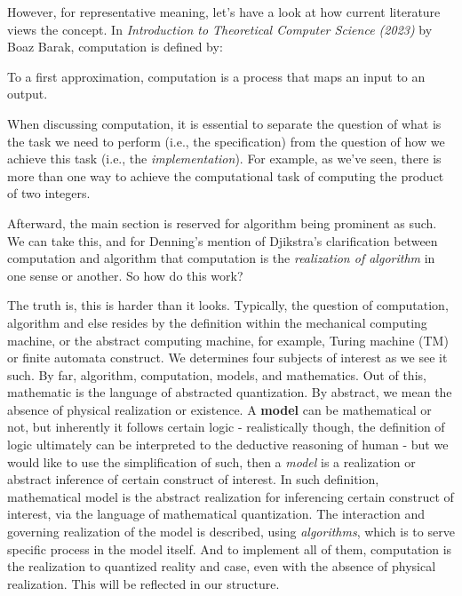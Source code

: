 However, for representative meaning, let's have a look at how current literature views the concept. In \textit{Introduction to Theoretical Computer Science (2023)} by Boaz Barak, computation is defined by:

\begin{displayquote}
    To a first approximation, computation is a process that maps an input to an output. 
    
    When discussing computation, it is essential to separate the question of what is the task we need to perform (i.e., the specification) from the question of how we achieve this task (i.e., the \textit{implementation}). For example, as we've seen, there is more than one way to achieve the computational task of computing the product of two integers.
\end{displayquote}

Afterward, the main section is reserved for algorithm being prominent as such. We can take this, and for Denning's mention of Djikstra's clarification between computation and algorithm that computation is the \textit{realization of algorithm} in one sense or another. So how do this work? 

The truth is, this is harder than it looks. Typically, the question of computation, algorithm and else resides by the definition within the mechanical computing machine, or the abstract computing machine, for example, Turing machine (TM) or finite automata construct. We determines four subjects of interest as we see it such. By far, algorithm, computation, models, and mathematics. Out of this, mathematic is the language of abstracted quantization. By abstract, we mean the absence of physical realization or existence. A \textbf{model} can be mathematical or not, but inherently it follows certain logic - realistically though, the definition of logic ultimately can be interpreted to the deductive reasoning of human - but we would like to use the simplification of such, then a \textit{model} is a realization or abstract inference of certain construct of interest. In such definition, mathematical model is the abstract realization for inferencing certain construct of interest, via the language of mathematical quantization. The interaction and governing realization of the model is described, using \textit{algorithms}, which is to serve specific process in the model itself. And to implement all of them, computation is the realization to quantized reality and case, even with the absence of physical realization. This will be reflected in our structure. 


